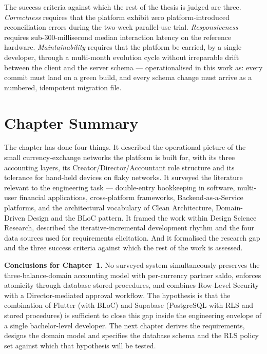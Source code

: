 The success criteria against which the rest of the thesis is judged are three. \emph{Correctness} requires that the platform exhibit zero platform-introduced reconciliation errors during the two-week parallel-use trial. \emph{Responsiveness} requires sub-300-millisecond median interaction latency on the reference hardware. \emph{Maintainability} requires that the platform be carried, by a single developer, through a multi-month evolution cycle without irreparable drift between the client and the server schema --- operationalised in this work as: every commit must land on a green build, and every schema change must arrive as a numbered, idempotent migration file.

\section{Chapter Summary}
\label{sec:ch1summary}

The chapter has done four things. It described the operational picture of the small currency-exchange networks the platform is built for, with its three accounting layers, its Creator/Director/Accountant role structure and its tolerance for hand-held devices on flaky networks. It surveyed the literature relevant to the engineering task --- double-entry bookkeeping in software, multi-user financial applications, cross-platform frameworks, Backend-as-a-Service platforms, and the architectural vocabulary of Clean Architecture, Domain-Driven Design and the BLoC pattern. It framed the work within Design Science Research, described the iterative-incremental development rhythm and the four data sources used for requirements elicitation. And it formalised the research gap and the three success criteria against which the rest of the work is assessed.

\noindent\textbf{Conclusions for Chapter~1.}
No surveyed system simultaneously preserves the three-balance-domain accounting model with per-currency partner saldo, enforces atomicity through database stored procedures, and combines Row-Level Security with a Director-mediated approval workflow. The hypothesis is that the combination of Flutter (with BLoC) and Supabase (PostgreSQL with RLS and stored procedures) is sufficient to close this gap inside the engineering envelope of a single bachelor-level developer. The next chapter derives the requirements, designs the domain model and specifies the database schema and the RLS policy set against which that hypothesis will be tested.
